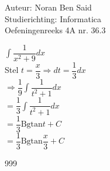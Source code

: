 \documentclass[a4paper]{article}
\begin{document}
  
\noindent \large Auteur: Noran Ben Said \\
\noindent \large Studierichting: Informatica\\
\noindent \large Oefeningenreeks 4A nr. 36.3\\

\medskip

\normalsize

$ \displaystyle\int \dfrac{1}{x^2 + 9} dx $ \\

Stel $t = \dfrac{x}{3} \Rightarrow dt = \dfrac{1}{3} dx$\\

$ \Rightarrow \dfrac{1}{9} \displaystyle\int \dfrac{1}{t^2 + 1} dx $ \\

$ = \dfrac{1}{3} \displaystyle\int \dfrac{1}{t^2 + 1} dx $ \\

$ = \dfrac{1}{3} \text{Bgtan} t + C $ \\

$ = \dfrac{1}{3} \text{Bgtan} \dfrac{x}{3} + C $ \\


\begin{thebibliography}{999}
\end{thebibliography}
\end{document}
